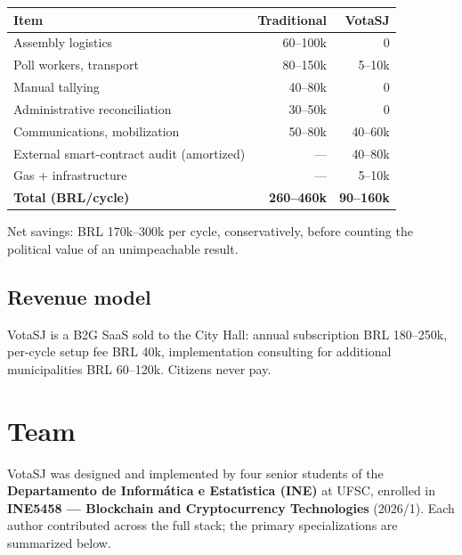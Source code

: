 \documentclass[12pt]{article}
\begin{document}
\noindent\begin{tabular}{l r r}
\toprule
\textbf{Item} & \textbf{Traditional} & \textbf{VotaSJ} \\
\midrule
Assembly logistics & 60--100k & 0 \\
Poll workers, transport & 80--150k & 5--10k \\
Manual tallying & 40--80k & 0 \\
Administrative reconciliation & 30--50k & 0 \\
Communications, mobilization & 50--80k & 40--60k \\
External smart-contract audit (amortized) & --- & 40--80k \\
Gas + infrastructure & --- & 5--10k \\
\midrule
\textbf{Total (BRL/cycle)} & \textbf{260--460k} & \textbf{90--160k} \\
\bottomrule
\end{tabular}

Net savings: BRL 170k--300k per cycle, conservatively, before counting the
political value of an unimpeachable result.

\subsection{Revenue model}

VotaSJ is a B2G SaaS sold to the City Hall: annual subscription BRL
180--250k, per-cycle setup fee BRL 40k, implementation consulting for
additional municipalities BRL 60--120k. Citizens never pay.

\section{Team}
\label{sec:team}

VotaSJ was designed and implemented by four senior students of the
\textbf{Departamento de Inform\'atica e Estat\'{\i}stica (INE)} at UFSC,
enrolled in \textbf{INE5458 --- Blockchain and Cryptocurrency Technologies}
(2026/1). Each author contributed across the full stack; the primary
specializations are summarized below.
\end{document}
